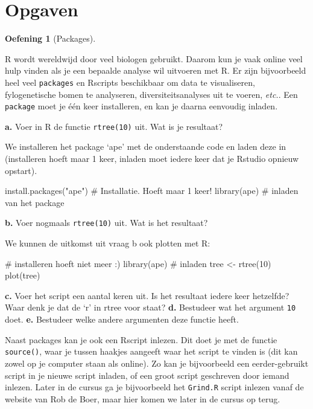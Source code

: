 \documentclass[
  a4paper,
]{scrbook}
\newenvironment{Shaded}{\begin{snugshade}}{\end{snugshade}}
\newcommand{\CommentTok}[1]{\textcolor[rgb]{0.37,0.37,0.37}{#1}}
\newcommand{\DecValTok}[1]{\textcolor[rgb]{0.68,0.00,0.00}{#1}}
\newcommand{\FunctionTok}[1]{\textcolor[rgb]{0.28,0.35,0.67}{#1}}
\newcommand{\NormalTok}[1]{\textcolor[rgb]{0.00,0.23,0.31}{#1}}
\newcommand{\OtherTok}[1]{\textcolor[rgb]{0.00,0.23,0.31}{#1}}
\newcommand{\StringTok}[1]{\textcolor[rgb]{0.13,0.47,0.30}{#1}}
\theoremstyle{definition}
\newtheorem{exercise}{Oefening}[chapter]
\theoremstyle{remark}
\begin{document}
\section{Opgaven}\label{opgaven-1}

\begin{exercise}[Packages]\protect\hypertarget{exr-packages}{}\label{exr-packages}

R wordt wereldwijd door veel biologen gebruikt. Daarom kun je vaak
online veel hulp vinden als je een bepaalde analyse wil uitvoeren met R.
Er zijn bijvoorbeeld heel veel \texttt{packages} en Rscripts beschikbaar
om data te visualiseren, fylogenetische bomen te analyseren,
diversiteitsanalyses uit te voeren, \emph{etc.}. Een \texttt{package}
moet je één keer installeren, en kan je daarna eenvoudig inladen.

\textbf{a.} Voer in R de functie \texttt{rtree(10)} uit. Wat is je
resultaat?

We installeren het package `ape' met de onderstaande code en laden deze
in (installeren hoeft maar 1 keer, inladen moet iedere keer dat je
Rstudio opnieuw opstart).

\begin{Shaded}
\begin{Highlighting}[]
\FunctionTok{install.packages}\NormalTok{(}\StringTok{"ape"}\NormalTok{) }\CommentTok{\# Installatie. Hoeft maar 1 keer!}
\FunctionTok{library}\NormalTok{(ape) }\CommentTok{\# inladen van het package}
\end{Highlighting}
\end{Shaded}

\textbf{b.} Voer nogmaals \texttt{rtree(10)} uit. Wat is het resultaat?

We kunnen de uitkomst uit vraag b ook plotten met R:

\begin{Shaded}
\begin{Highlighting}[]
\CommentTok{\# installeren hoeft niet meer :)}
\FunctionTok{library}\NormalTok{(ape) }\CommentTok{\# inladen}
\NormalTok{tree }\OtherTok{\textless{}{-}} \FunctionTok{rtree}\NormalTok{(}\DecValTok{10}\NormalTok{)}
\FunctionTok{plot}\NormalTok{(tree)}
\end{Highlighting}
\end{Shaded}

\textbf{c.} Voer het script een aantal keren uit. Is het resultaat
iedere keer hetzelfde? Waar denk je dat de `r' in rtree voor staat?
\textbf{d.} Bestudeer wat het argument \texttt{10} doet. \textbf{e.}
Bestudeer welke andere argumenten deze functie heeft.

Naast packages kan je ook een Rscript inlezen. Dit doet je met de
functie \texttt{source()}, waar je tussen haakjes aangeeft waar het
script te vinden is (dit kan zowel op je computer staan als online). Zo
kan je bijvoorbeeld een eerder-gebruikt script in je nieuwe script
inladen, of een groot script geschreven door iemand inlezen. Later in de
cursus ga je bijvoorbeeld het \texttt{Grind.R} script inlezen vanaf de
website van Rob de Boer, maar hier komen we later in de cursus op terug.

\end{exercise}
\end{document}
